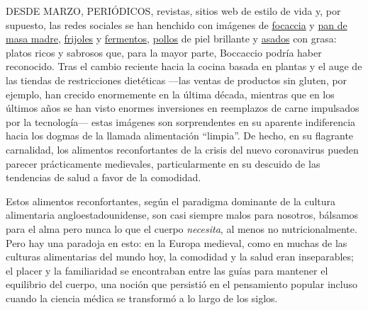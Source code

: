 DESDE MARZO, PERIÓDICOS, revistas, sitios web de estilo de vida y, por
supuesto, las redes sociales se han henchido con imágenes de
\href{https://www.nytimes3xbfgragh.onion/2020/04/24/dining/focaccia-bread.html}{focaccia}
y
\href{https://www.nytimes3xbfgragh.onion/2020/04/11/science/sourdough-bread-starter-library.html}{pan
de masa madre},
\href{https://www.nytimes3xbfgragh.onion/2020/03/22/business/coronavirus-beans-sales.html}{frijoles}
y
\href{https://www.nytimes3xbfgragh.onion/2020/04/07/realestate/home-farming-tips-coronavirus.html}{fermentos},
\href{https://www.nytimes3xbfgragh.onion/2020/07/03/dining/the-most-delicious-chicken.html}{pollos}
de piel brillante y
\href{https://cooking.nytimes3xbfgragh.onion/recipes/1020845-slow-cooker-pot-roast}{asados}
con grasa: platos ricos y sabrosos que, para la mayor parte, Boccaccio
podría haber reconocido. Tras el cambio reciente hacia la cocina basada
en plantas y el auge de las tiendas de restricciones dietéticas ---las
ventas de productos sin gluten, por ejemplo, han crecido enormemente en
la última década, mientras que en los últimos años se han visto enormes
inversiones en reemplazos de carne impulsados por la tecnología--- estas
imágenes son sorprendentes en su aparente indiferencia hacia los dogmas
de la llamada alimentación ``limpia''. De hecho, en su flagrante
carnalidad, los alimentos reconfortantes de la crisis del nuevo
coronavirus pueden parecer prácticamente medievales, particularmente en
su descuido de las tendencias de salud a favor de la comodidad.

Estos alimentos reconfortantes, según el paradigma dominante de la
cultura alimentaria angloestadounidense, son casi siempre malos para
nosotros, bálsamos para el alma pero nunca lo que el cuerpo
\emph{necesita}, al menos no nutricionalmente. Pero hay una paradoja en
esto: en la Europa medieval, como en muchas de las culturas alimentarias
del mundo hoy, la comodidad y la salud eran inseparables; el placer y la
familiaridad se encontraban entre las guías para mantener el equilibrio
del cuerpo, una noción que persistió en el pensamiento popular incluso
cuando la ciencia médica se transformó a lo largo de los siglos.

